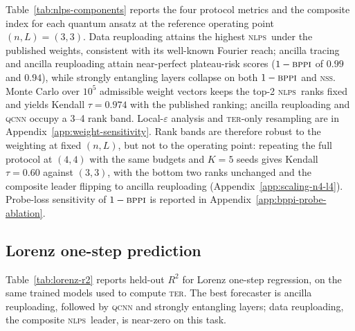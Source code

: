 \documentclass{article}
\newcommand{\nlc}{\textsc{nlc}}
\newcommand{\bppi}{\textsc{bppi}}
\newcommand{\nss}{\textsc{nss}}
\newcommand{\ter}{\textsc{ter}}
\newcommand{\nlps}{\textsc{nlps}}
\begin{document}
Table~\ref{tab:nlps-components} reports the four protocol metrics and the composite index for each quantum ansatz at the reference operating point $(n,L)=(3,3)$.
Data reuploading attains the highest \nlps\ under the published weights, consistent with its well-known Fourier reach; ancilla tracing and ancilla reuploading attain near-perfect plateau-risk scores ($1 - \bppi$ of $0.99$ and $0.94$), while strongly entangling layers collapse on both $1 - \bppi$ and \nss.
Monte Carlo over $10^5$ admissible weight vectors keeps the top-2 \nlps\ ranks fixed and yields Kendall $\tau = 0.974$ with the published ranking; ancilla reuploading and \textsc{qcnn} occupy a 3--4 rank band.
Local-$\varepsilon$ analysis and \ter-only resampling are in Appendix~\ref{app:weight-sensitivity}.
Rank bands are therefore robust to the weighting at fixed $(n,L)$, but not to the operating point: repeating the full protocol at $(4,4)$ with the same budgets and $K=5$ seeds gives Kendall $\tau = 0.60$ against $(3,3)$, with the bottom two ranks unchanged and the composite leader flipping to ancilla reuploading (Appendix~\ref{app:scaling-n4-l4}).
Probe-loss sensitivity of $1-\bppi$ is reported in Appendix~\ref{app:bppi-probe-ablation}.

\begin{table}[t]
  \caption{Protocol components and composite \nlps\ per quantum ansatz (higher is better in all columns). \protect}
  \label{tab:nlps-components}
  \centering
  \small
  \setlength{\tabcolsep}{6pt}
  \resizebox{\textwidth}{!}{
  \begin{tabular}{lrrrrr}
    \toprule
    Method & \nlc & $1 - \bppi$ & \ter & \nss & \nlps \\
    \midrule
    
    \\
    \bottomrule
  \end{tabular}
  }
\end{table}

\subsection{Lorenz one-step prediction}
\label{sec:lorenz-results}

Table~\ref{tab:lorenz-r2} reports held-out $R^2$ for Lorenz one-step regression, on the same trained models used to compute \ter.
The best forecaster is ancilla reuploading, followed by \textsc{qcnn} and strongly entangling layers; data reuploading, the composite \nlps\ leader, is near-zero on this task.
\end{document}
